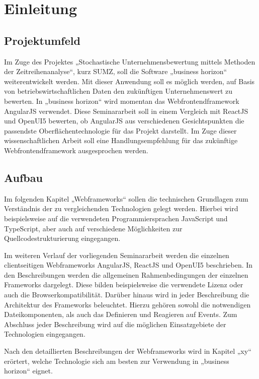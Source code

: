 
\chapter{Einleitung}

\section{Projektumfeld}

Im Zuge des Projektes „Stochastische Unternehmensbewertung mittels Methoden der Zeitreihenanalyse“, kurz SUMZ, soll die Software „business horizon“ weiterentwickelt werden. Mit dieser Anwendung soll es möglich werden, auf Basis von betriebswirtschaftlichen Daten den zukünftigen Unternehmenswert zu bewerten. In „business horizon“ wird momentan das Webfrontendframework AngularJS verwendet. Diese Seminararbeit soll in einem Vergleich mit ReactJS und OpenUI5 bewerten, ob AngularJS aus verschiedenen Gesichtspunkten die passendste Oberflächentechnologie für das Projekt darstellt. Im Zuge dieser wissenschaftlichen Arbeit soll eine Handlungsempfehlung für das zukünftige Webfrontendframework ausgesprochen werden.

\section{Aufbau}

Im folgenden Kapitel „Webframeworks“ sollen die technischen Grundlagen zum Verständnis der zu vergleichenden Technologien gelegt werden. Hierbei wird beispielsweise auf die verwendeten Programmiersprachen JavaScript und TypeScript, aber auch auf verschiedene Möglichkeiten zur Quellcodestrukturierung eingegangen. 

Im weiteren Verlauf der vorliegenden Seminararbeit werden die einzelnen clientseitigen Webframeworks AngularJS, ReactJS und OpenUI5 beschrieben. In den Beschreibungen werden die allgemeinen Rahmenbedingungen der einzelnen Frameworks dargelegt. Diese bilden beispielsweise die verwendete Lizenz oder auch die Browserkompatibilität. Darüber hinaus wird in jeder Beschreibung die Architektur des Frameworks beleuchtet. Hierzu gehören sowohl die notwendigen Dateikomponenten, als auch das Definieren und Reagieren auf Events. Zum Abschluss jeder Beschreibung wird auf die möglichen Einsatzgebiete der Technologien eingegangen.

Nach den detaillierten Beschreibungen der Webframeworks wird in Kapitel „xy“ erörtert, welche Technologie sich am besten zur Verwendung in „business horizon“ eignet.